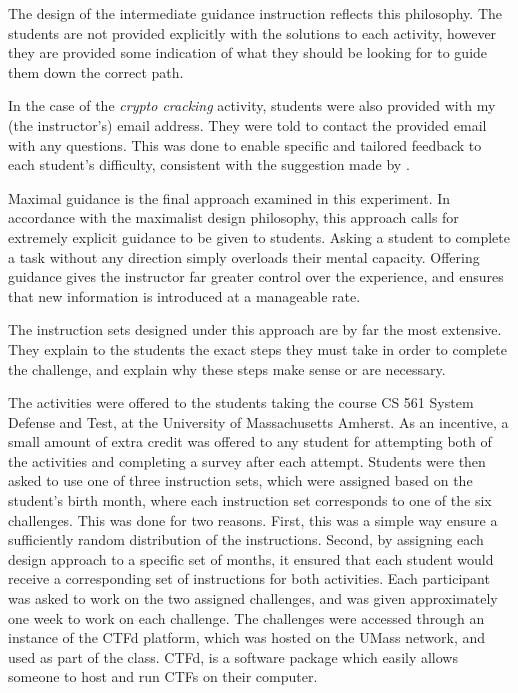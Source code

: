         The design of the intermediate guidance instruction reflects this philosophy. 
        The students are not provided explicitly with the solutions to each activity, however they are provided some indication of what they should be looking for to guide them down the correct path.

        In the case of the \emph{crypto cracking} activity, students were also provided with my (the instructor's) email address. 
        They were told to contact the provided email with any questions. 
        This was done to enable specific and tailored feedback to each student's difficulty, consistent with the suggestion made by \citeauthor{R-Weiss}.

        Maximal guidance is the final approach examined in this experiment. 
        In accordance with the maximalist design philosophy, this approach calls for extremely explicit guidance to be given to students. 
        Asking a student to complete a task without any direction simply overloads their mental capacity. 
        Offering guidance gives the instructor far greater control over the experience, and ensures that new information is introduced at a manageable rate. 

        The instruction sets designed under this approach are by far the most extensive. 
        They explain to the students the exact steps they must take in order to complete the challenge, and explain why these steps make sense or are necessary. 

    The activities were offered to the students taking the course CS 561 System Defense and Test, at the University of Massachusetts Amherst. 
    As an incentive, a small amount of extra credit was offered to any student for attempting both of the activities and completing a survey after each attempt. 
    Students were then asked to use one of three instruction sets, which were assigned based on the student's birth month, where each instruction set corresponds to one of the six challenges. 
    This was done for two reasons. 
    First, this was a simple way ensure a sufficiently random distribution of the instructions. 
    Second, by assigning each design approach to a specific set of months, it ensured that each student would receive a corresponding set of instructions for both activities.     
    Each participant was asked to work on the two assigned challenges, and was given approximately one week to work on each challenge. 
    The challenges were accessed through an instance of the CTFd platform, which was hosted on the UMass network, and used as part of the class. 
    CTFd, is a software package which easily allows someone to host and run CTFs on their computer.
    
